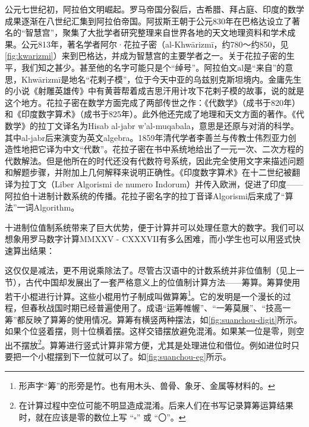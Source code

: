 \documentclass[b5paper]{ctexart}
\begin{document}
\begin{mdframed}
 \label{sec:Khwarizmi}
公元七世纪初，阿拉伯文明崛起。罗马帝国分裂后，古希腊、拜占庭、印度的数学成果逐渐在八世纪汇集到阿拉伯帝国。阿拔斯王朝于公元830年在巴格达设立了著名的“智慧宫”，聚集了大批学者研究整理来自世界各地的天文地理资料和学术成果。公元813年，著名学者阿尔·花拉子密（al-Khwārizmī，约780～约850，见\cref{fig:kwarizmi}）来到巴格达，并成为智慧宫的主要学者之一。关于花拉子密的生平，我们知之甚少。甚至他的名字可能只是个“绰号”。阿拉伯文al是“来自”的意思，Khwārizmī是地名“花剌子模”，位于今天中亚的乌兹别克斯坦境内。金庸先生的小说《射雕英雄传》中有黄蓉帮着成吉思汗用计攻下花剌子模的故事，说的就是这个地方。花拉子密在数学方面完成了两部传世之作：《代数学》（成书于820年）和《印度数字算术》（成书于825年）。此外他还完成了地理和天文方面的著作。《代数学》的拉丁文译名为Hisab al-jabr w'al-muqabala，意思是还原与对消的科学。其中al-jabr后来演变为英文algebra。1859年清代学者李善兰与传教士伟烈亚力创造性地把它译为中文“代数”\cite{HanXueTao2009}。花拉子密在书中系统地给出了一元一次、二次方程的代数解法。但是他所在的时代还没有代数符号系统，因此完全使用文字来描述问题和解题步骤，并附加上几何解释来说明正确性。《印度数字算术》在十二世纪被翻译为拉丁文（Liber Algorismi de numero Indorum）并传入欧洲，促进了印度——阿拉伯十进制计数系统的传播。花拉子密名字的拉丁音译Algorismi后来成了“算法”一词Algorithm\cite{Britannica-25}。

\end{mdframed}

十进制位值制系统带来了巨大优势，便于计算并可以处理任意大的数字。我们可以想象用罗马数字计算MMXXV - CXXXVII有多么困难，而小学生也可以用竖式快速算出结果：

\begin{center}
\end{center}

\label{sec:counting-rods} 
这仅仅是减法，更不用说乘除法了。尽管古汉语中的计数系统并非位值制（见上一节），古代中国却发展出了一套严格意义上的位值制计算方法——筹算。筹算使用若干小棍进行计算。这些小棍用竹子制成叫做算筹\footnote{形声字“筹”的形旁是竹。也有用木头、兽骨、象牙、金属等材料的。}。它的发明是一个漫长的过程，但春秋战国时期已经普遍使用了。成语“运筹帷幄”、“一筹莫展”、“技高一筹”都反映了算筹的使用情况。算筹有横竖两种摆法，如\cref{fig:suanchou-digit}所示。如果个位竖着摆，则十位横着摆。这样交错摆放避免混淆。如果某一位是零，则空出不摆放\footnote{在计算过程中空位可能不明显造成混淆。后来人们在书写记录算筹运算结果时，就在应该是零的数位上写 “$\square$” 或 “〇”。}。算筹进行竖式计算非常方便，尤其是处理进位和借位。例如进位时只要把一个小棍摆到下一位就可以了。如\cref{fig:suanchou-eg}所示。
\end{document}
